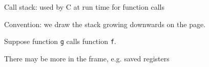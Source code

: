 \documentclass[landscape]{beamer}
\begin{document}
\begin{frame}[fragile]{Call stack: used by C at run time for function calls}


Convention: we draw the stack growing \alert{downwards} on the page. 

Suppose function \texttt g calls function \texttt f.


There may be more in the frame, e.g. saved registers  
\end{frame}   
\end{document}
